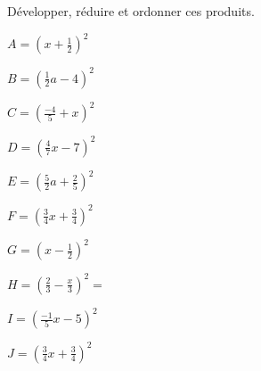 
Développer, réduire et ordonner ces produits.

\begin{minipage}{0.49\linewidth}
\begin{description}
\item $A=\left(x+\frac{1}{2}\right)^2$
\item $B=\left(\frac{1}{2}a-4\right)^2$
\item $C=\left(\frac{-4}{5}+x\right)^2$
\item $D=\left(\frac{4}{7}x-7\right)^2$
\item $E=\left(\frac{5}{2}a+\frac{2}{5}\right)^2$
\end{description}
\end{minipage}
\hfill
\begin{minipage}{0.49\linewidth}
\begin{description}
\item $F=\left(\frac{3}{4}x+\frac{3}{4}\right)^2 $
\item $G=\left(x-\frac{1}{2}\right)^2 $
\item $H=\left(\frac{2}{3}-\frac{x}{3}\right)^2=$
\item $I=\left(\frac{-1}{5}x-5\right)^2 $
\item $J=\left(\frac{3}{4}x+\frac{3}{4}\right)^2$
\end{description}
\end{minipage}